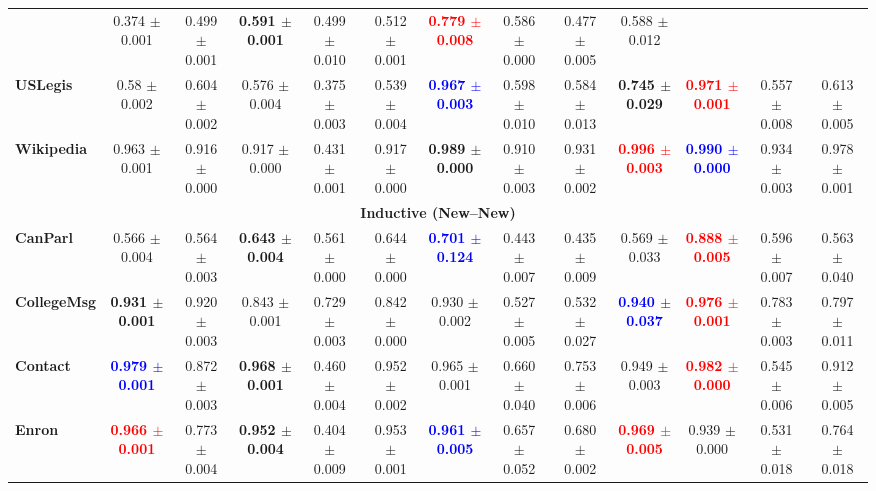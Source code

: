 {\begin{tabular}{lccccc|ccccccc}
& 0.374 $\pm$ 0.001 
& 0.499 $\pm$ 0.001 
& \textbf{0.591 $\pm$ 0.001 }
& 0.499 $\pm$ 0.010 
& 0.512 $\pm$ 0.001 
& \textcolor{red}{\textbf{0.779 $\pm$ 0.008 }}
& 0.586 $\pm$ 0.000 
& 0.477 $\pm$ 0.005 
& 0.588 $\pm$ 0.012  \\
\textbf{USLegis} 
& 0.58 $\pm$ 0.002
& 0.604 $\pm$ 0.002 
& 0.576 $\pm$ 0.004 
& 0.375 $\pm$ 0.003 
& 0.539 $\pm$ 0.004 
& \textcolor{blue}{\textbf{0.967 $\pm$ 0.003 }}
& 0.598 $\pm$ 0.010 
& 0.584 $\pm$ 0.013 
& \textbf{0.745 $\pm$ 0.029 }
& \textcolor{red}{\textbf{0.971 $\pm$ 0.001 }}
& 0.557 $\pm$ 0.008 
& 0.613 $\pm$ 0.005 \\
\textbf{Wikipedia} 
& 0.963 $\pm$ 0.001 
& 0.916 $\pm$ 0.000 
& 0.917 $\pm$ 0.000 
& 0.431 $\pm$ 0.001 
& 0.917 $\pm$ 0.000 
& \textbf{0.989 $\pm$ 0.000 } 
& 0.910 $\pm$ 0.003 
& 0.931 $\pm$ 0.002 
& \textcolor{red}{\textbf{0.996 $\pm$ 0.003 }} 
& \textcolor{blue}{\textbf{0.990 $\pm$ 0.000 }} 
& 0.934 $\pm$ 0.003 
& 0.978 $\pm$ 0.001 \\
\midrule
\multicolumn{13}{c}{\textbf{Inductive (New--New)}}\\
\midrule
\textbf{CanParl} 
& 0.566 $\pm$ 0.004 
& 0.564 $\pm$ 0.003 
& \textbf{0.643 $\pm$ 0.004 }
& 0.561 $\pm$ 0.000 
& 0.644 $\pm$ 0.000 
& \textcolor{blue}{\textbf{0.701 $\pm$ 0.124 }}
& 0.443 $\pm$ 0.007 
& 0.435 $\pm$ 0.009 
& 0.569 $\pm$ 0.033 
& \textcolor{red}{\textbf{0.888 $\pm$ 0.005 }}
& 0.596 $\pm$ 0.007 
& 0.563 $\pm$ 0.040  \\
\textbf{CollegeMsg} 
& \textbf{0.931 $\pm$ 0.001 } 
& 0.920 $\pm$ 0.003 
& 0.843 $\pm$ 0.001 
& 0.729 $\pm$ 0.003 
& 0.842 $\pm$ 0.000 
& 0.930 $\pm$ 0.002 
& 0.527 $\pm$ 0.005 
& 0.532 $\pm$ 0.027 
& \textcolor{blue}{\textbf{0.940 $\pm$ 0.037 }}
& \textcolor{red}{\textbf{0.976 $\pm$ 0.001 }} 
& 0.783 $\pm$ 0.003 
& 0.797 $\pm$ 0.011 \\
\textbf{Contact} 
& \textcolor{blue}{\textbf{0.979 $\pm$ 0.001 }} 
& 0.872 $\pm$ 0.003 
& \textbf{0.968 $\pm$ 0.001 } 
& 0.460 $\pm$ 0.004 
& 0.952 $\pm$ 0.002 
& 0.965 $\pm$ 0.001 
& 0.660 $\pm$ 0.040 
& 0.753 $\pm$ 0.006 
& 0.949 $\pm$ 0.003 
& \textcolor{red}{\textbf{0.982 $\pm$ 0.000 }} 
& 0.545 $\pm$ 0.006 
& 0.912 $\pm$ 0.005 \\
\textbf{Enron} 
& \textcolor{red}{\textbf{0.966 $\pm$ 0.001 }}
& 0.773 $\pm$ 0.004 
& \textbf{0.952 $\pm$ 0.004 }
& 0.404 $\pm$ 0.009 
& 0.953 $\pm$ 0.001 
& \textcolor{blue}{\textbf{0.961 $\pm$ 0.005 }} 
& 0.657 $\pm$ 0.052 
& 0.680 $\pm$ 0.002 
& \textcolor{red}{\textbf{0.969 $\pm$ 0.005 }} 
& 0.939 $\pm$ 0.000 
& 0.531 $\pm$ 0.018 
& 0.764 $\pm$ 0.018 \\

\end{tabular}}
